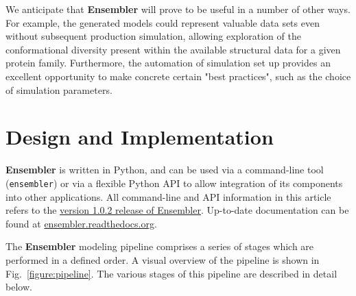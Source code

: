 \documentclass[aps,prl,preprint,nofootinbib,superscriptaddress,linenumbers]{revtex4-1}
\begin{document}
We anticipate that {\bf Ensembler} will prove to be useful in a number of other ways.
For example, the generated models could represent valuable data sets even without subsequent production simulation, allowing exploration of the conformational diversity present within the available structural data for a given protein family.
Furthermore, the automation of simulation set up provides an excellent opportunity to make concrete certain "best practices", such as the choice of simulation parameters.

\section{Design and Implementation}

{\bf Ensembler} is written in Python, and can be used via a command-line tool ({\tt ensembler}) or via a flexible Python API to allow integration of its components into other applications.
All command-line and API information in this article refers to the \href{https://github.com/choderalab/ensembler/tree/v1.0.2}{version 1.0.2 release of Ensembler}.
Up-to-date documentation can be found at \href{http://ensembler.readthedocs.org/en/latest/}{ensembler.readthedocs.org}.

The {\bf Ensembler} modeling pipeline comprises a series of stages which are performed in a defined order. 
A visual overview of the pipeline is shown in Fig.~\ref{figure:pipeline}.
The various stages of this pipeline are described in detail below.
\end{document}
